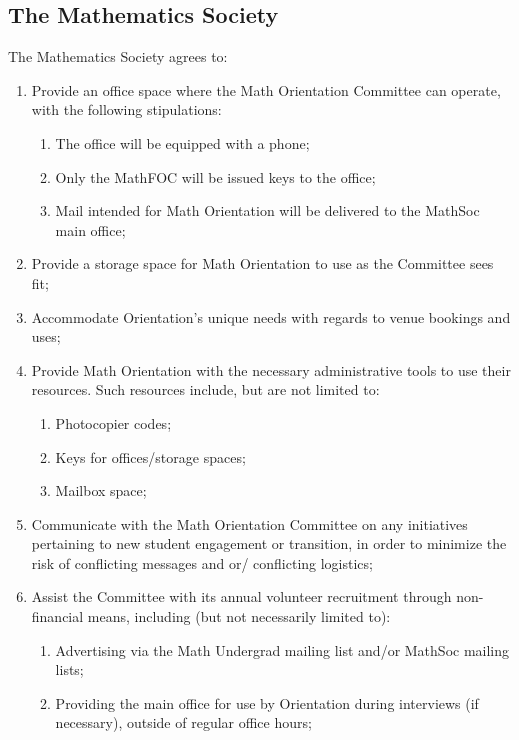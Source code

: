 \documentclass[12pt, letterpaper]{mathsoc}
\begin{document}
\subsection{The Mathematics Society}
The Mathematics Society agrees to:
\begin{enumerate}
    \item Provide an office space where the Math Orientation Committee can operate, with the following stipulations:
    \begin{enumerate}
    \item The office will be equipped with a phone;
    \item Only the MathFOC will be issued keys to the office;
    \item Mail intended for Math Orientation will be delivered to the MathSoc main office;
    \end{enumerate}
    \item Provide a storage space for Math Orientation to use as the Committee sees fit;
    \item Accommodate Orientation’s unique needs with regards to venue bookings and uses;
    \item Provide Math Orientation with the necessary administrative tools to use their resources. Such resources include, but are not limited to:
    \begin{enumerate}
    \item Photocopier codes;
    \item Keys for offices/storage spaces;
    \item Mailbox space;
    \end{enumerate}
    \item Communicate with the Math Orientation Committee on any initiatives pertaining to new student engagement or transition, in order to minimize the risk of conflicting messages and or/ conflicting logistics;
    \item Assist the Committee with its annual volunteer recruitment through non-financial means, including (but not necessarily limited to):
    \begin{enumerate}
    \item Advertising via the Math Undergrad mailing list and/or MathSoc mailing lists;
    \item Providing the main office for use by Orientation during interviews (if necessary), outside of regular office hours;
    \end{enumerate}
\end{enumerate}
\end{document}
